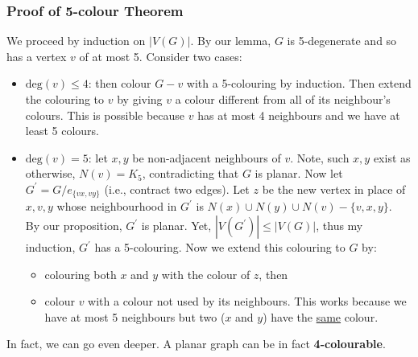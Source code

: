 \documentclass{report}
\begin{document}
\subsubsection{Proof of 5-colour Theorem}
We proceed by induction on $|V(G)|$. By our lemma, $G$ is 5-degenerate and so has a vertex $v$ of at most 5. Consider two cases:
\begin{itemize}
\item $\mathrm{deg}(v) \leq 4$: then colour $G-v$ with a 5-colouring by induction. Then extend the colouring to $v$ by giving $v$ a colour different from all of its neighbour's colours. This is possible because $v$ has at most 4 neighbours and we have at least 5 colours.
\item $\mathrm{deg}(v) = 5$: let $x, y$ be non-adjacent neighbours of $v$. Note, such $x,y$ exist as otherwise, $N(v) = K_5$, contradicting that $G$ is planar. Now let $G^\prime = G / e_{\{vx, vy\}}$ (i.e., contract two edges). Let $z$ be the new vertex in place of $x,v,y$ whose neighbourhood in $G^\prime$ is $N(x) \cup N(y) \cup N(v) - \{v,x,y\}$.\\By our proposition, $G^\prime$ is planar. Yet, $|V(G^\prime)| \leq |V(G)|$, thus my induction, $G^\prime$ has a 5-colouring. Now we extend this colouring to $G$ by:
\begin{itemize}
\item colouring both $x$ and $y$ with the colour of $z$, then
\item colour $v$ with a colour not used by its neighbours. This works because we have at most 5 neighbours but two ($x$ and $y$) have the \underline{same} colour.
\end{itemize}
\end{itemize}
In fact, we can go even deeper. A planar graph can be in fact \textbf{4-colourable}.
\end{document}
